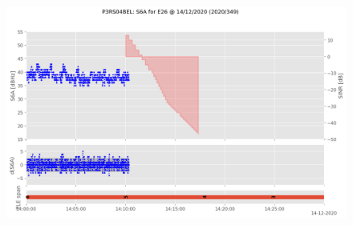 \begin{enumerate}
\begin{figure}[H]%
\centering%
\includegraphics[width=0.95\linewidth]{png/P3RS04BEL_R_20203490000_01D_00U_MO_E-S6A-E26.png}%
\end{figure}


\end{enumerate}
